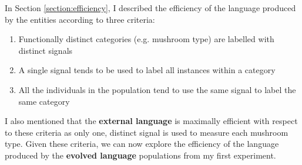 \documentclass[12pt,a4paper]{report}
\begin{document}
In Section \ref{section:efficiency}, I described the efficiency of the language produced by the entities according to three criteria:

\begin{enumerate}
	\item Functionally distinct categories (e.g. mushroom type) are labelled with distinct signals
	\item A single signal tends to be used to label all instances within a category
	\item All the individuals in the population tend to use the same signal to label the same category
\end{enumerate}

I also mentioned that the {\bf external language} is maximally efficient with respect to these criteria as only one, distinct signal is used to measure each mushroom type. Given these criteria, we can now explore the efficiency of the language produced by the {\bf evolved language} populations from my first experiment. 
\end{document}
